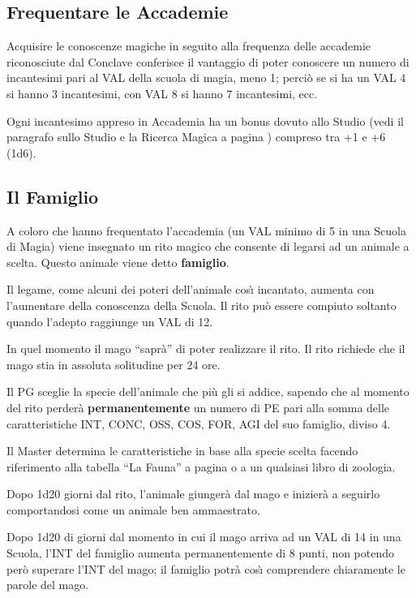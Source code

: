 \subsection{Frequentare le Accademie} 

Acquisire le conoscenze magiche in
seguito alla frequenza delle accademie riconosciute dal Conclave
conferisce il vantaggio di poter conoscere un numero di incantesimi
pari al VAL della scuola di magia, meno 1; perci\`o se si ha un VAL
4 si hanno 3 incantesimi, con VAL 8 si hanno 7 incantesimi, ecc.

Ogni incantesimo appreso in Accademia ha un bonus dovuto allo Studio
(vedi il paragrafo sullo Studio e la Ricerca Magica a pagina
\pageref{ricercamagica}) compreso tra +1 e +6 (1d6).

\iffullversion
\subsection{Il Famiglio}

 A coloro che hanno frequentato l'accademia (un VAL minimo di
5 in una Scuola di Magia) viene insegnato un rito magico che consente
di legarsi ad un animale a scelta. Questo animale viene detto
\textbf{famiglio}.

Il legame, come alcuni dei poteri dell'animale cos\`{\i}
incantato, aumenta con l'aumentare della conoscenza della Scuola. Il
rito pu\`o essere compiuto soltanto quando l'adepto raggiunge un VAL
di 12. 

In quel momento il mago ``sapr\`a'' di poter realizzare il
rito. Il rito richiede che il mago stia in assoluta solitudine per 24
ore. 

Il PG sceglie la specie dell'animale che pi\`u gli si addice,
sapendo che al momento del rito perder\`a \textbf{permanentemente}
un numero di PE pari alla somma delle caratteristiche INT, CONC, OSS,
COS, FOR, AGI del suo famiglio, diviso 4.

Il Master determina le caratteristiche in base alla specie scelta
facendo riferimento alla tabella ``La Fauna'' a pagina
\pageref{tabanimali} o a un qualsiasi libro di zoologia.

Dopo 1d20
giorni dal rito, l'animale giunger\`a dal mago e inizier\`a a
seguirlo comportandosi come un animale ben ammaestrato. 

Dopo 1d20 di giorni dal momento in cui il mago arriva ad un VAL di 14
in una Scuola, l'INT del famiglio aumenta permanentemente di 8 punti,
non potendo per\`o superare l'INT del mago; il famiglio potr\`a
cos\`{\i} comprendere chiaramente le parole del mago.

